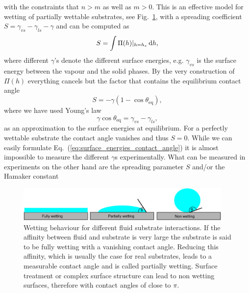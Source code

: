 with the constraints that $n>m$ as well as $m > 0$.
This is an effective model for wetting of partially wettable substrates, see Fig.~\ref{fig:wetting_angle}, with a spreading coefficient $S = \gamma_{vs} - \gamma_{ls} - \gamma$ and can be computed as~\cite{peschkaSignaturesSlipDewetting2019}
\begin{equation}\label{eq:disj_spreading}
    S = \int\Pi(h)|_{h=h_{\ast}} \mathop{}\!\mathrm{d} h, 
\end{equation}
where different $\gamma$'s denote the different surface energies, e.g. $\gamma_{vs}$ is the surface energy between the vapour and the solid phases.
By the very construction of $\Pi(h)$ everything cancels but the factor that contains the equilibrium contact angle  
\begin{equation}\label{eq:disj_young}
    S = -\gamma(1 - \cos\theta_{\text{eq}}),
\end{equation}\label{eq:Youngs_law}
where we have used Young's law~\cite{youngIIIEssayCohesion1805}
\begin{equation}\label{eq:surface_energies_contact_angle}
    \gamma\cos\theta_{\text{eq}} = \gamma_{vs} - \gamma_{ls},
\end{equation}
as an approximation to the surface energies at equilibrium.
For a perfectly wettable substrate the contact angle vanishes and thus $S=0$.
While we can easily formulate Eq.~(\ref{eq:surface_energies_contact_angle}) it is almost impossible to measure the different $\gamma$s experimentally.
What can be measured in experiments on the other hand are the spreading parameter $S$ and/or the Hamaker constant~\cite{hamakerLondonVanWaals1937, bonnWettingSpreading2009, diezMetallicthinfilmInstabilitySpatially2016, peschkaSignaturesSlipDewetting2019} 
\begin{figure}
    \centering
    \includegraphics[width=0.95\textwidth]{graphics/Wettings.pdf}
    \caption{Wetting behaviour for different fluid substrate interactions.
    If the affinity between fluid and substrate is very large the substrate is said to be fully wetting with a vanishing contact angle.
    Reducing this affinity, which is usually the case for real substrates, leads to a measurable contact angle and is called partially wetting.
    Surface treatment or complex surface structure can lead to non wetting surfaces, therefore with contact angles of close to $\pi$.}
    \label{fig:wetting_angle}
\end{figure} 

